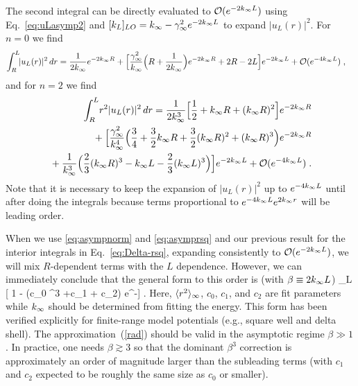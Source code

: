 	The second integral can be directly evaluated to $\mathcal{O}(e^{-2k_{\infty} L})$
	using Eq.~\eqref{eq:uLasymp2} and $[k_L]_{LO} = k_{\infty} - \gamma_\infty^2 e^{-2k_{\infty} L}$
	to expand $|u_L(r)|^2$.  For $n=0$ we find
	\begin{align}
	  \int_R^L\! &|u_L(r)|^2\, dr =  \frac{1}{2k_{\infty}}e^{-2k_{\infty} R} + \Bigl[
	  \frac{\gamma_\infty^2}{k_{\infty}} \Bigl(R + \frac{1}{2k_{\infty}}\Bigr)e^{-2k_{\infty} R} + 2R -
		2L \Bigr]e^{-2k_{\infty} L} + \mathcal{O}(e^{-4k_{\infty} L}) \;,
	  \label{eq:asympnorm}
	\end{align}
	and for $n=2$ we find
	\begin{align}
  	\int_R^L\! r^2 |u_L(r)|^2\, dr =
  	\frac{1}{2\kinf^3}\Bigl[ \frac12 + \kinf R + (\kinf R)^2 \Bigr]
		e^{-2\kinf R}
    \nonumber \\
		\null +  \Bigl[ \frac{\ANC^2}{\kinf^4} \Bigl( \frac34 + \frac32\kinf R +
		\frac32(\kinf R)^2 + (\kinf R)^3 \Bigr)e^{-2\kinf R}  \nonumber \\
    \null + \frac{1}{\kinf^3} \Bigl( \frac23 (\kinf R)^3 - \kinf L - \frac23
		(\kinf L)^3 \Bigr) \Bigr]e^{-2\kinf L}
		+ \mathcal{O}(e^{-4\kinf L})  \;.
    \label{eq:asymprsq}
	\end{align}
	Note that it is necessary to keep the expansion of $|u_L(r)|^2$ up to
	$e^{-4k_{\infty} L}$	until after doing the integrals because terms proportional
	to $e^{-4k_{\infty} L} e^{2k_{\infty} r}$ will be leading order.

	When we use \eqref{eq:asympnorm} and \eqref{eq:asymprsq} and our previous
	result for the interior integrals in Eq.~\eqref{eq:Delta-rsq}, expanding
	consistently to $\mathcal{O}(e^{-2k_{\infty} L})$, we will mix $R$-dependent
	terms with the $L$ dependence.  However, we can immediately conclude that
	the general form to this order is (with $\beta \equiv 2k_{\infty} L$)
	\bea
	 	\rsqav_L \approx {\rsqinf}[ 1 - (c_0 \beta^3 +c_1 \beta + c_2) e^{-\beta}]
	  \;.
		\label{rad}
	\eea
	Here, $\langle r^2 \rangle_{\infty}$, $c_0$, $c_1$, and $c_2$ are fit parameters while $k_{\infty}$
	should be determined from fitting the energy. 	This form has been verified
	explicitly for finite-range model potentials (e.g., square well
	and delta shell). 	The approximation~(\ref{rad}) should be valid
	in the asymptotic regime $\beta\gg 1$.  In practice, one needs
	$\beta\gtrsim 3$ so that the dominant $\beta^3$ correction is
	approximately an order of magnitude larger than the subleading terms
	(with $c_1$ and $c_2$ expected to be roughly the same size as
	$c_0$ or smaller).

